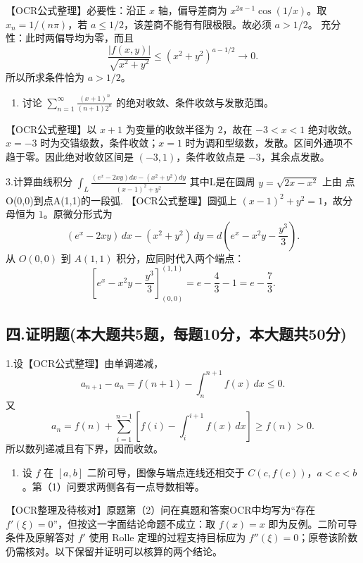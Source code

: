 \documentclass[11pt,fontset=fandol]{ctexart}
\providecommand{\tightlist}{\setlength{\itemsep}{0pt}\setlength{\parskip}{0pt}}
\begin{document}
【OCR公式整理】必要性：沿正 \(x\) 轴，偏导差商为
\(x^{2a-1}\cos(1/x)\)。取 \(x_n=1/(n\pi)\)，若
\(a\le1/2\)，该差商不能有有限极限。故必须 \(a>1/2\)。
充分性：此时两偏导均为零，而且 \[
\frac{|f(x,y)|}{\sqrt{x^2+y^2}}
\le(x^2+y^2)^{a-1/2}\to0.
\] 所以所求条件恰为 \(a>1/2\)。

\begin{enumerate}
\def\labelenumi{\arabic{enumi}.}
\setcounter{enumi}{1}
\tightlist
\item
  讨论 \(\sum_{n=1}^\infty\frac{(x+1)^n}{(n+1)2^n}\)
  的绝对收敛、条件收敛与发散范围。
\end{enumerate}

【OCR公式整理】以 \(x+1\) 为变量的收敛半径为 \(2\)，故在 \(-3<x<1\)
绝对收敛。\(x=-3\) 时为交错级数，条件收敛；\(x=1\)
时为调和型级数，发散。区间外通项不趋于零。因此绝对收敛区间是
\((-3,1)\)，条件收敛点是 \(-3\)，其余点发散。

3.计算曲线积分
\(\int _ { L } { \frac { ( e ^ { x } - 2 x y ) d x - ( x ^ { 2 } + y ^ { 2 } ) d y } { ( x - 1 ) ^ { 2 } + y ^ { 2 } } }\)
其中L是在圆周 \(y = \sqrt { 2 x - x ^ { 2 } }\) 上由
点O(0,0)到点A(1,1)的一段弧. 【OCR公式整理】圆弧上
\((x-1)^2+y^2=1\)，故分母恒为 \(1\)。原微分形式为 \[
(e^x-2xy)\,dx-(x^2+y^2)\,dy
=d\left(e^x-x^2y-\frac{y^3}{3}\right).
\] 从 \(O(0,0)\) 到 \(A(1,1)\) 积分，应同时代入两个端点： \[
\left[e^x-x^2y-\frac{y^3}{3}\right]_{(0,0)}^{(1,1)}
=e-\frac43-1=e-\frac73.
\]

\subsection{四.证明题(本大题共5题，每题10分，本大题共50分)}\label{ux56db.ux8bc1ux660eux9898ux672cux5927ux9898ux51715ux9898ux6bcfux989810ux5206ux672cux5927ux9898ux517150ux5206}

1.设【OCR公式整理】由单调递减， \[
a_{n+1}-a_n=f(n+1)-\int_n^{n+1}f(x)\,dx\le0.
\] 又 \[
a_n=f(n)+\sum_{i=1}^{n-1}\left[f(i)-\int_i^{i+1}f(x)\,dx\right]\ge f(n)>0.
\] 所以数列递减且有下界，因而收敛。

\begin{enumerate}
\def\labelenumi{\arabic{enumi}.}
\setcounter{enumi}{1}
\tightlist
\item
  设 \(f\) 在 \([a,b]\) 二阶可导，图像与端点连线还相交于
  \(C(c,f(c))\)，\(a<c<b\)。第（1）问要求两侧各有一点导数相等。
\end{enumerate}

【OCR整理及待核对】原题第（2）问在真题和答案OCR中均写为``存在
\(f'(\xi)=0\)''，但按这一字面结论命题不成立：取 \(f(x)=x\)
即为反例。二阶可导条件及原解答对 \(f'\) 使用 Rolle
定理的过程支持目标应为
\(f''(\xi)=0\)；原卷该阶数仍需核对。以下保留并证明可以核算的两个结论。
\end{document}
